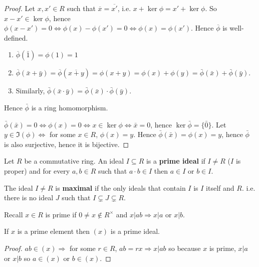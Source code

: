 \begin{proof}
	Let $x, x' \in R$ such that $\overline{x} = \overline{x'}$, i.e. $x + \ker \phi = x' + \ker \phi$. So $x - x' \in \ker \phi$, hence $\phi(x - x') = 0 \Leftrightarrow \phi(x) - \phi(x') = 0 \Leftrightarrow \phi(x) = \phi(x')$. Hence $\overline{\phi}$ is well-defined.

	\begin{enumerate}
		\item $\overline{\phi}(\bar{1}) = \phi(1) = 1$
		\item $\overline{\phi}(\bar{x} + \bar{y}) = \overline{\phi}(\overline{x + y}) = \phi(x + y) = \phi(x) + \phi(y) = \bar{\phi}(\bar{x}) + \bar{\phi}(\bar{y})$.
		\item Similarly, $\bar{\phi}(\bar{x}\cdot \bar{y}) = \bar{\phi}(\bar{x}) \cdot \bar{\phi}(\bar{y})$.
	\end{enumerate}

	Hence $\bar{\phi}$ is a ring homomorphism.

	$\bar{\phi}(\bar{x}) = 0 \Leftrightarrow \phi(x) = 0 \Leftrightarrow x \in \ker \phi \Leftrightarrow \bar{x} = 0$, hence $\ker \bar{\phi} = \{\bar{0}\}$.
	Let $y \in \Im(\phi) \Leftrightarrow$ for some $x \in R$, $\phi(x) = y$. Hence $\bar{\phi}(\bar{x}) = \phi(x) = y$, hence $\bar{\phi}$ is also surjective, hence it is bijective.
\end{proof}

\begin{definition}
	Let $R$ be a commutative ring. An ideal $I \subseteq R$ is a \textbf{prime ideal} if $I \ne R$ ($I$ is proper) and for every $a, b \in R$ such that $a \cdot b \in I$ then $a \in I$ or $b \in I$.

	The ideal $I \ne R$ is \textbf{maximal} if the only ideals that contain $I$ is $I$ itself and $R$. i.e. there is no ideal $J$ such that $I \subsetneq J \subsetneq R$.
\end{definition}

\begin{theorem}
	Recall $x \in R$ is prime if $0 \ne x \notin R^{\times}$ and $x | ab \Rightarrow x | a$ or $x | b$.

	If $x$ is a prime element then $(x)$ is a prime ideal.
\end{theorem}

\begin{proof}
	$ab \in (x) \Rightarrow$ for some $r \in R$, $ab = rx \Rightarrow x | ab$ so because $x$ is prime, $x | a$ or $x | b$ so $a \in (x)$ or $b \in (x)$.
\end{proof}

